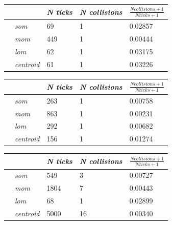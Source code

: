 \documentclass[conference]{IEEEtran}
\begin{document}
\begin{center}
\begin{tabular}{ | m{2.8em} | m{3em} | m{2.8em} | m{5em} | m{5.2em} | }
\hline
{} & \textit{N ticks} & \textit{N collisions} & $\frac{N collisions + 1}{N ticks + 1}$ \\
\hline
{} & \textit{som} & 69 & 1 & 0.02857 \\
 & \textit{mom} & 449 & 1 & 0.00444 \\
 & \textit{lom} & 62 & 1 & 0.03175 \\
 & \textit{centroid} & 61 & 1 & 0.03226 \\
\hline
\end{tabular}
\label{table:ps5e1asum}
\end{center}


\begin{center}
\begin{tabular}{ | m{2.8em} | m{3em} | m{2.8em} | m{5em} | m{5.2em} | }
\hline
{} & \textit{N ticks} & \textit{N collisions} & $\frac{N collisions + 1}{N ticks + 1}$ \\
\hline
{} & \textit{som} & 263 & 1 & 0.00758 \\
 & \textit{mom} & 863 & 1 & 0.00231 \\
 & \textit{lom} & 292 & 1 & 0.00682 \\
 & \textit{centroid} & 156 & 1 & 0.01274 \\
\hline
\end{tabular}
\label{table:ps5e2amax}
\end{center}

\begin{center}
\begin{tabular}{ | m{2.8em} | m{3em} | m{2.8em} | m{5em} | m{5.2em} | }
\hline
{} & \textit{N ticks} & \textit{N collisions} & $\frac{N collisions + 1}{N ticks + 1}$ \\
\hline
{} & \textit{som} & 549 & 3 & 0.00727 \\
 & \textit{mom} & 1804 & 7 & 0.00443 \\
 & \textit{lom} & 68 & 1 & 0.02899 \\
 & \textit{centroid} & 5000 & 16 & 0.00340 \\
\hline
\end{tabular}
\label{table:ps5e2asum}
\end{center}
\end{document}
